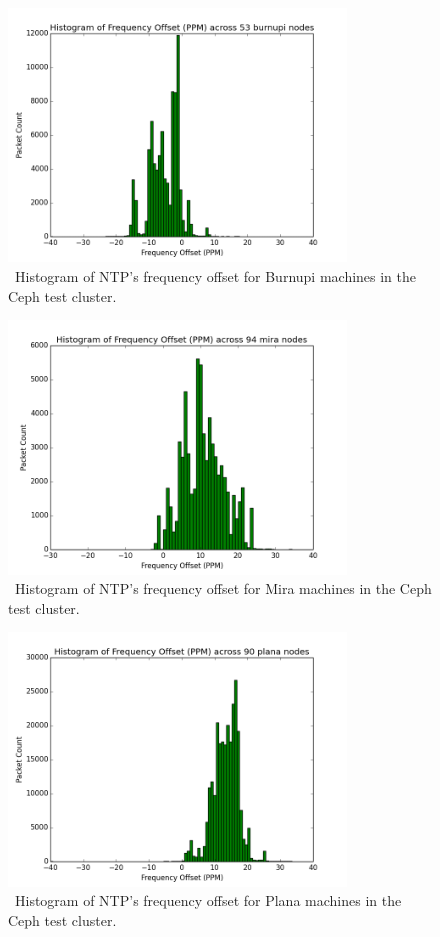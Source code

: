 \begin{figure}[h]
  \centering
  \caption{~Histogram of NTP's frequency offset for Burnupi machines in the Ceph test cluster.}
  \label{fig:burnupi-hist}
  \includegraphics[width=0.8\textwidth]{burnupi-freq-offset.png}
\end{figure}

\begin{figure}[h]
  \centering
  \caption{~Histogram of NTP's frequency offset for Mira machines in the Ceph test cluster.}
  \label{fig:mira-hist}
  \includegraphics[width=0.8\textwidth]{mira-freq-offset.png}
\end{figure}

\begin{figure}[h]
  \centering
  \caption{~Histogram of NTP's frequency offset for Plana machines in the Ceph test cluster.}
  \label{fig:plana-hist}
  \includegraphics[width=0.8\textwidth]{plana-freq-offset.png}
\end{figure}

